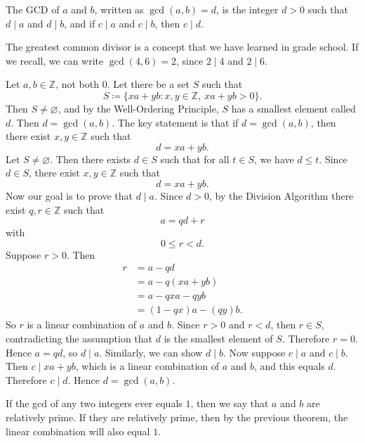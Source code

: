 \begin{definition}
    The GCD of $a$ and $b$, written as $\gcd(a,b) = d$, is the integer $d>0$ such that $d\mid a$ and $d\mid b$, and if $c\mid a$ and $c\mid b$, then $c\mid d$.
\end{definition}

The greatest common divisor is a concept that we have learned in grade school.
If we recall, we can write $\gcd(4,6) = 2$, since $2\mid 4$ and $2\mid 6$.

\begin{theorem}{
    Let $a,b\in\mathbb{Z}$, not both $0$.
    Let there be a set $S$ such that
    \[
        S \coloneqq \{xa + yb : x,y\in\mathbb{Z},\ xa + yb > 0\}.
    \]
    Then $S\neq \varnothing$, and by the Well-Ordering Principle, $S$ has a smallest element called $d$.
    Then $d = \gcd(a,b)$.
    The key statement is that if $d = \gcd(a,b)$, then there exist $x,y\in\mathbb{Z}$ such that
    \[
        d = xa + yb.
    \]
}
    Let $S\neq \varnothing$.
    Then there exists $d\in S$ such that for all $t\in S$, we have $d \leq t$.
    Since $d\in S$, there exist $x,y\in\mathbb{Z}$ such that
    \[
        d = xa + yb.
    \]
    Now our goal is to prove that $d\mid a$.
    Since $d>0$, by the Division Algorithm there exist $q,r\in\mathbb{Z}$ such that
    \[
        a = qd + r
    \]
    with
    \[
        0\leq r < d.
    \]
    Suppose $r > 0$.
    Then
    \begin{align*}
        r &= a - qd\\
        &= a - q(xa + yb)\\
        &= a - qxa - qyb\\
        &= (1 - qx)a - (qy)b.
    \end{align*}
    So $r$ is a linear combination of $a$ and $b$.
    Since $r > 0$ and $r < d$, then $r\in S$, contradicting the assumption that $d$ is the smallest element of $S$.
    Therefore $r = 0$.
    Hence $a = qd$, so $d\mid a$.
    Similarly, we can show $d\mid b$.
    Now suppose $c\mid a$ and $c\mid b$.
    Then $c\mid xa+yb$, which is a linear combination of $a$ and $b$, and this equals $d$.
    Therefore $c\mid d$.
    Hence $d = \gcd(a,b)$.
\end{theorem}

If the gcd of any two integers ever equals $1$, then we say that $a$ and $b$ are relatively prime.
If they are relatively prime, then by the previous theorem, the linear combination will also equal $1$.

